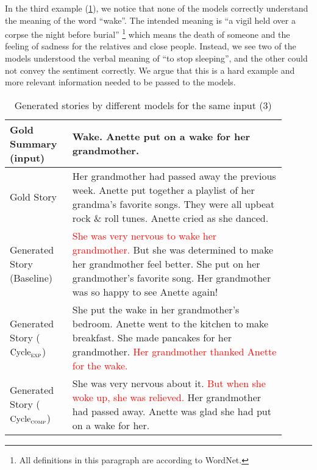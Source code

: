 In the third example (\cref{tab:comp-sample-3}), we notice that none of the models correctly understand the meaning of the word ``wake''. The intended meaning is ``a vigil held over a corpse the night before burial'' \footnote{All definitions in this paragraph are according to WordNet.} which means the death of someone and the feeling of sadness for the relatives and close people. Instead, we see two of the models understood the verbal meaning of ``to stop sleeping'', and the other could not convey the sentiment correctly. We argue that this is a hard example and more relevant information needed to be passed to the models.

\begin{table}[h]
\centering
\begin{tabular}{p{0.2\linewidth} | p{0.7\linewidth}}
Gold Summary (input)  & Wake. Anette put on a wake for her grandmother. \\ \hline
Gold Story & Her grandmother had passed away the previous week. Anette put together a playlist of her grandma's favorite songs. They were all upbeat rock \& roll tunes. Anette cried as she danced. \\ \hline
Generated Story (Baseline) & \textcolor{red}{She was very nervous to wake her grandmother.} But she was determined to make her grandmother feel better. She put on her grandmother's favorite song. Her grandmother was so happy to see Anette again! \\ \hline
Generated Story ($\text{Cycle}_{\textsc{exp}}$) & She put the wake in her grandmother's bedroom. Anette went to the kitchen to make breakfast. She made pancakes for her grandmother. \textcolor{red}{Her grandmother thanked Anette for the wake.} \\ \hline
Generated Story ($\text{Cycle}_{\textsc{comp}}$) & She was very nervous about it. \textcolor{red}{But when she woke up, she was relieved.} Her grandmother had passed away. Anette was glad she had put on a wake for her.
\end{tabular}
\caption{Generated stories by different models for the same input (3)}
\label{tab:comp-sample-3}
\end{table}

